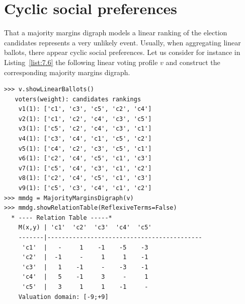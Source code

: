 \section{Cyclic social preferences}
\label{sec:7.4}

That a majority margins digraph models a linear ranking of the election candidates represents a very unlikely event. Usually, when aggregating linear ballots, there appear cyclic social preferences. Let us consider for instance in Listing~\vref{list:7.6} the following linear voting profile $v$ and construct the corresponding majority margins digraph.
\begin{lstlisting}[caption={Example of cyclic social preferences},label=list:7.6]
>>> v.showLinearBallots()
   voters(weight): candidates rankings
    v1(1): ['c1', 'c3', 'c5', 'c2', 'c4']
    v2(1): ['c1', 'c2', 'c4', 'c3', 'c5']
    v3(1): ['c5', 'c2', 'c4', 'c3', 'c1']
    v4(1): ['c3', 'c4', 'c1', 'c5', 'c2']
    v5(1): ['c4', 'c2', 'c3', 'c5', 'c1']
    v6(1): ['c2', 'c4', 'c5', 'c1', 'c3']
    v7(1): ['c5', 'c4', 'c3', 'c1', 'c2']
    v8(1): ['c2', 'c4', 'c5', 'c1', 'c3']
    v9(1): ['c5', 'c3', 'c4', 'c1', 'c2']
>>> mmdg = MajorityMarginsDigraph(v)
>>> mmdg.showRelationTable(ReflexiveTerms=False)
  * ---- Relation Table -----*
    M(x,y) | 'c1'  'c2'  'c3'  'c4'  'c5'	  
    -------|-------------------------------------------
     'c1'  |   -     1    -1    -5    -3	 
     'c2'  |  -1     - 	   1     1    -1	 
     'c3'  |   1    -1 	   -    -3    -1	 
     'c4'  |   5    -1     3     -     1	 
     'c5'  |   3     1 	   1    -1     - 	 
    Valuation domain: [-9;+9]
\end{lstlisting}    


